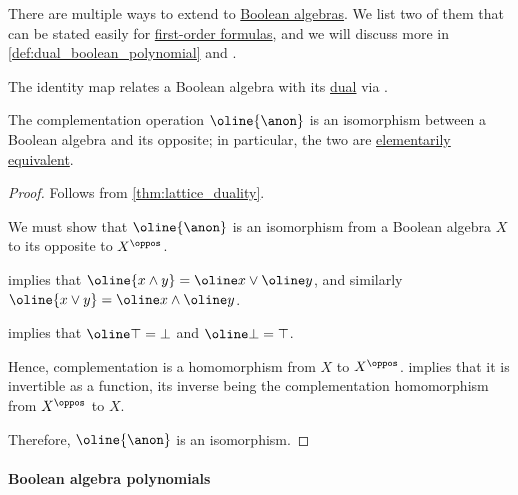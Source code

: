 \begin{theorem}\label{thm:boolean_algebra_duality}
  There are multiple ways to extend  to \hyperref[def:boolean_algebra]{Boolean algebras}. We list two of them that can be stated easily for \hyperref[def:fol_formula]{first-order formulas}, and we will discuss more in \cref{def:dual_boolean_polynomial} and .

  \begin{thmenum}
     The identity map relates a Boolean algebra with its \hyperref[def:boolean_algebra/opposite]{dual} via .

     The complementation operation \( \oline{\anon} \) is an isomorphism between a Boolean algebra and its opposite; in particular, the two are \hyperref[def:elementary_equivalence]{elementarily equivalent}.
  \end{thmenum}
\end{theorem}
\begin{proof}
   Follows from \cref{thm:lattice_duality}.

   We must show that \( \oline{\anon} \) is an isomorphism from a Boolean algebra \( X \) to its opposite to \( X^\oppos \).

   implies that \( \oline{x \wedge y} = \oline x \vee \oline y \), and similarly \( \oline{x \vee y} = \oline x \wedge \oline y \).

   implies that \( \oline \top = \bot \) and \( \oline \bot = \top \).

  Hence, complementation is a homomorphism from \( X \) to \( X^\oppos \).  implies that it is invertible as a function, its inverse being the complementation homomorphism from \( X^\oppos \) to \( X \).

  Therefore, \( \oline{\anon} \) is an isomorphism.
\end{proof}

\paragraph{Boolean algebra polynomials}


